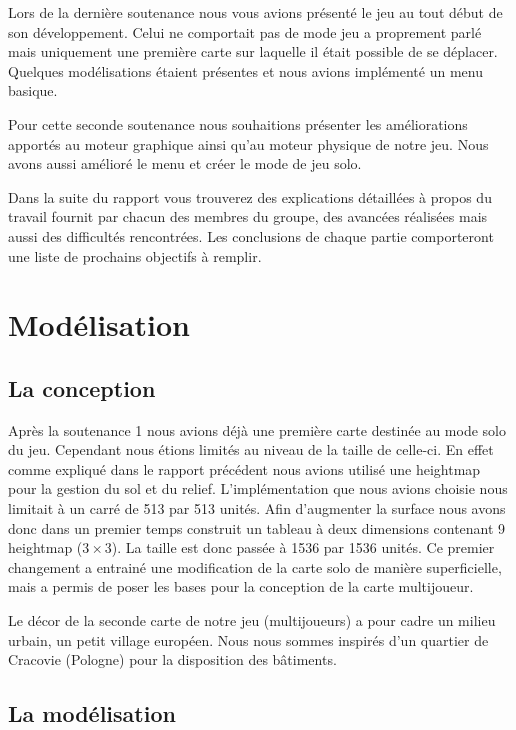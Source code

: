 \documentclass[11pt]{report}
\begin{document}
Lors de la dernière soutenance nous vous avions présenté le jeu au tout début de son développement. Celui ne comportait pas de mode jeu a proprement parlé mais uniquement une première carte sur laquelle il était possible de se déplacer. Quelques modélisations étaient présentes et nous avions implémenté un menu basique.

Pour cette seconde soutenance nous souhaitions présenter les améliorations apportés au moteur graphique ainsi qu’au moteur physique de notre jeu. Nous avons aussi amélioré le menu et créer le mode de jeu solo.

Dans la suite du rapport vous trouverez des explications détaillées à propos du travail fournit par chacun des membres du groupe, des avancées réalisées mais aussi des difficultés rencontrées. Les conclusions de chaque partie comporteront une liste de prochains objectifs à remplir.

\newpage
\section{Modélisation}

\subsection{La conception}

Après la soutenance 1 nous avions déjà une première carte destinée au mode solo du jeu. Cependant nous étions limités au niveau de la taille de celle-ci. En effet comme expliqué dans le rapport précédent nous avions utilisé une heightmap pour la gestion du sol et du relief. L’implémentation que nous avions choisie nous limitait à un carré de 513 par 513 unités. Afin d’augmenter la surface nous avons donc dans un premier temps construit un tableau à deux dimensions contenant 9 heightmap (\(3 \times 3\)). La taille est donc passée à 1536 par 1536 unités. Ce premier changement a entrainé une modification de la carte solo de manière superficielle, mais a permis de poser les bases pour la conception de la carte multijoueur.

Le décor de la seconde carte de notre jeu (multijoueurs) a pour cadre un milieu urbain, un petit village européen. Nous nous sommes inspirés d’un quartier de Cracovie (Pologne) pour la disposition des bâtiments.

\subsection{La modélisation}
\end{document}
